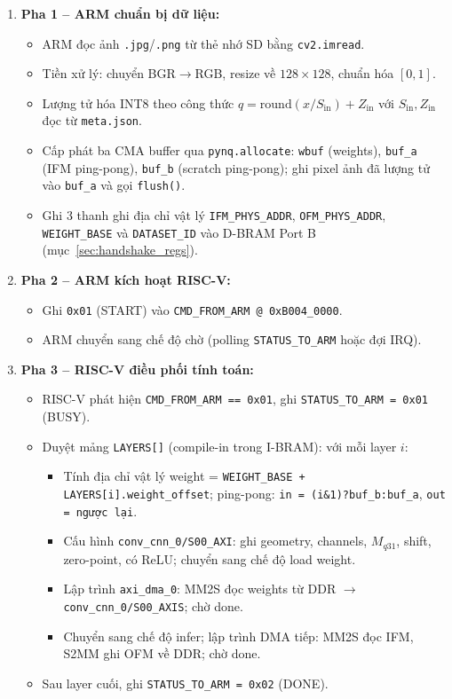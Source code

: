 \begin{enumerate}
    \item \textbf{Pha 1 -- ARM chuẩn bị dữ liệu:}
    \begin{itemize}
        \item ARM đọc ảnh \texttt{.jpg}/\texttt{.png} từ thẻ nhớ SD bằng \texttt{cv2.imread}.
        \item Tiền xử lý: chuyển BGR$\to$RGB, resize về $128 \times 128$, chuẩn hóa $[0,1]$.
        \item Lượng tử hóa INT8 theo công thức $q = \mathrm{round}(x / S_{\mathrm{in}}) + Z_{\mathrm{in}}$ với $S_{\mathrm{in}}, Z_{\mathrm{in}}$ đọc từ \texttt{meta.json}.
        \item Cấp phát ba CMA buffer qua \texttt{pynq.allocate}: \texttt{wbuf} (weights), \texttt{buf\_a} (IFM ping-pong), \texttt{buf\_b} (scratch ping-pong); ghi pixel ảnh đã lượng tử vào \texttt{buf\_a} và gọi \texttt{flush()}.
        \item Ghi 3 thanh ghi địa chỉ vật lý \texttt{IFM\_PHYS\_ADDR}, \texttt{OFM\_PHYS\_ADDR}, \texttt{WEIGHT\_BASE} và \texttt{DATASET\_ID} vào D-BRAM Port B (mục~\ref{sec:handshake_regs}).
    \end{itemize}

    \item \textbf{Pha 2 -- ARM kích hoạt RISC-V:}
    \begin{itemize}
        \item Ghi \texttt{0x01} (START) vào \texttt{CMD\_FROM\_ARM @ 0xB004\_0000}.
        \item ARM chuyển sang chế độ chờ (polling \texttt{STATUS\_TO\_ARM} hoặc đợi IRQ).
    \end{itemize}

    \item \textbf{Pha 3 -- RISC-V điều phối tính toán:}
    \begin{itemize}
        \item RISC-V phát hiện \texttt{CMD\_FROM\_ARM == 0x01}, ghi \texttt{STATUS\_TO\_ARM = 0x01} (BUSY).
        \item Duyệt mảng \texttt{LAYERS[]} (compile-in trong I-BRAM): với mỗi layer $i$:
        \begin{itemize}
            \item Tính địa chỉ vật lý weight = \texttt{WEIGHT\_BASE + LAYERS[i].weight\_offset}; ping-pong: \texttt{in = (i\&1)?buf\_b:buf\_a}, \texttt{out = ngược lại}.
            \item Cấu hình \texttt{conv\_cnn\_0/S00\_AXI}: ghi geometry, channels, $M_{q31}$, shift, zero-point, có ReLU; chuyển sang chế độ load weight.
            \item Lập trình \texttt{axi\_dma\_0}: MM2S đọc weights từ DDR $\to$ \texttt{conv\_cnn\_0/S00\_AXIS}; chờ done.
            \item Chuyển sang chế độ infer; lập trình DMA tiếp: MM2S đọc IFM, S2MM ghi OFM về DDR; chờ done.
        \end{itemize}
        \item Sau layer cuối, ghi \texttt{STATUS\_TO\_ARM = 0x02} (DONE).
    \end{itemize}


\end{enumerate}
